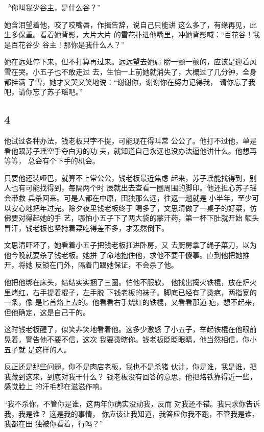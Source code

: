 〝你叫我少谷主，是什么谷？”

她含泪望着他，咬了咬嘴唇，作揖告辞，说自己只能讲
这么多了，有缘再见，此生多保重。看着她背影，大片大片
的雪花扑进他嘴里，冲她背影喊：“百花谷！我是百花谷少
谷主！那你是我什么人？”

她在远处停下来，但不打算再过来。远远望去她肩
膀一颤一颤的，应该是迎着风雪在哭。小五子也不敢走过
去，生怕一上前她就消失了，大概过了几分钟，全身都挂满
了雪，她才又哭又笑地说：“谢谢你，谢谢你在努力记得我，
请你忘了我吧，请你忘了苏子瑶吧。”
\newline

{\centering\subsection{4}}

他试过各种办法，钱老板只字不提，可能现在得叫常
公公了。他打不过他，单是看他跟苏子瑶空手夺白刃的功
夫，就知道自己永远也没办法逼他讲什么。他想再等等，
总会有个下手的机会。

只要他还装哑巴，就算不上常公公，钱老板最近焦虑
起来，苏子瑶能找得到，别人也有可能找得到，每隔两个时
辰就出去查看一圈周围的脚印。他还担心苏子瑶会带救
兵杀回来。可是人都在中原，田独那么远，往返一趟就是
小半年，至少可以安心地把年过完。除夕夜里钱老板终于
喝多了，文思清做了一桌子的好菜，仿佛要对得起她的手
艺，哪怕小五子下了两大袋的蒙汗药，第一杯下肚就开始
额头冒汗，钱老板也坚持着菜吃得差不多，才轰然倒下。

文思清吓坏了，她看着小五子把钱老板扛进卧房，又
去厨房拿了绳子菜刀，以为他今晚就要杀了钱老板。她拼
了命地抱住他，求他不要干傻事。直到他把她推开，将她
反锁在门外，隔着门跟她保证，不会杀了他。

他把他绑在床头，结结实实捆了三圈。怕他不服软，
他找出捣火铁棍，放在炉火里烤红，右手提着棍子，左手脱
下钱老板的袜子。脚底已经有了烫疤，两指宽的一条，像
是匕首烙上去的。他看看右手烧红的铁棍，又看看那道
疤，想不起来，但他确定，这是自己干的。

这时钱老板醒了，似笑非笑地看着他。这多少激怒
了小五子，举起铁棍在他眼前晃着，警告他不要不信，这次
我要烫瞎你。钱老板眨眨眼睛，他当然相信，你小五子就
是这样的人。

反正还是那些问题，你不是肉店老板，我也不是杀猪
伙计，你是谁，我是谁，把我藏到这来，到底对我干什么？
钱老板没有回答的意思，他把烙铁靠得近一些，感觉脸上
的汗毛都在滋滋作响。

“我不杀你，不管你是谁，这两年你确实没动我，反而
对我还不错。我只求你告诉我，我是谁？ 这是我的事情，
你应该让我知道，我答应你我不跑，不管我是谁，我都在田
独被你看着，行吗？”

